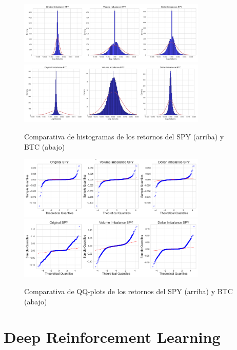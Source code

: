 \documentclass[a4paper,12pt, twoside]{report}
\begin{document}
\begin{figure}[H]
    \centering
    \includegraphics[width=0.8\textwidth]{figures/SPY_histogram_comparation.png}
    \includegraphics[width=0.8\textwidth]{figures/BTC_histogram_comparation.png}
    \caption{Comparativa de histogramas de los retornos del SPY (arriba) y BTC (abajo)}
    \label{fig:histogram_comparison}
\end{figure}

\begin{figure}[H]
    \centering
    \includegraphics[width=0.8\textwidth]{figures/SPY_qq_comparison.png}
    \includegraphics[width=0.8\textwidth]{figures/BTC_qq_comparison.png}
    \caption{Comparativa de QQ-plots de los retornos del SPY (arriba) y BTC (abajo)}
    \label{fig:qqplot_comparison}
\end{figure}

\chapter{Deep Reinforcement Learning}
\end{document}
